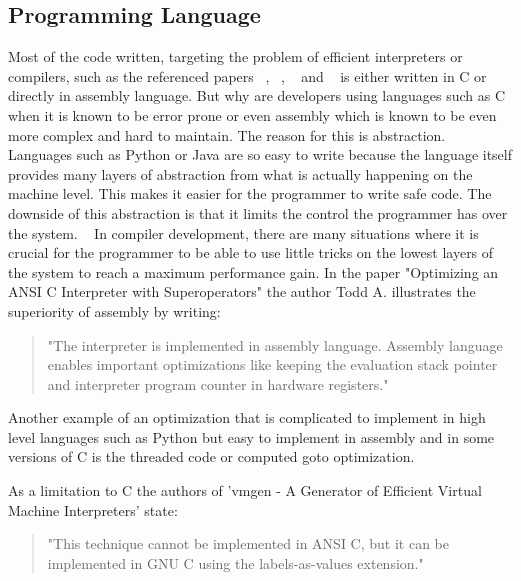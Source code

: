 \documentclass{article}
\begin{document}
\subsection{Programming Language}
Most of the code written, targeting the problem of efficient interpreters or
compilers, such as the referenced papers ~\cite{vmgen}, ~\cite{modern},
~\cite{superoperators} and ~\cite{stack_caching_for_interpreters} is either
written in C or directly in assembly language. 
But why are developers using languages such as C when it is known to be error
prone or even assembly which is known to be even more complex and hard to
maintain.
The reason for this is abstraction. Languages such as Python or Java are so
easy to write because the language itself provides many layers of abstraction
from what is actually happening on the machine level. This makes it easier for
the programmer to write safe code. The downside of this abstraction is that it
limits the control the programmer has over the system. ~\cite{abstraction}
In compiler development, there are many situations where it is crucial for the
programmer to be able to use little tricks on the lowest layers of the system
to reach a maximum performance gain. In the paper "Optimizing an ANSI C
Interpreter with Superoperators" the author Todd A. illustrates the superiority
of assembly by writing:

\begin{quotation}
"The interpreter is implemented in assembly language.
Assembly language enables important optimizations like keeping the evaluation
stack pointer and interpreter program counter in hardware registers." ~\cite{superoperators}
\end{quotation}

Another example of an optimization that is complicated to implement in high
level languages such as Python but easy to implement in assembly and in some
versions of C is the threaded code or computed goto optimization.

As a limitation to C the authors of 'vmgen - A Generator of Efficient Virtual
Machine Interpreters' state:

\begin{quotation} 
"This technique cannot be implemented in ANSI C, but it can be implemented in
GNU C using the labels-as-values extension." ~\cite{vmgen} 
\end{quotation}
\end{document}
